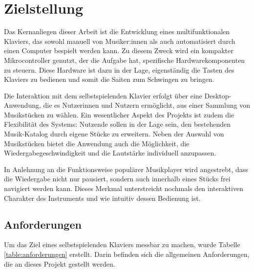 
\chapter{Zielstellung} \label{Zielstellung}

\nocite{*}


Das Kernanliegen dieser Arbeit ist die Entwicklung eines multifunktionalen Klaviers,
das sowohl manuell von Musiker:innen als auch automatisiert durch einen Computer bespielt werden kann.
Zu diesem Zweck wird ein kompakter Mikrocontroller genutzt, der die Aufgabe hat, spezifische Hardwarekomponenten zu steuern.
Diese Hardware ist dazu in der Lage, eigenständig die Tasten des Klaviers zu bedienen und somit die Saiten zum Schwingen zu bringen.

Die Interaktion mit dem selbstspielenden Klavier erfolgt über eine Desktop-Anwendung, die es Nutzerinnen und Nutzern ermöglicht,
aus einer Sammlung von Musikstücken zu wählen.
Ein wesentlicher Aspekt des Projekts ist zudem die Flexibilität des Systems: Nutzende sollen in der Lage sein,
den bestehenden Musik-Katalog durch eigene Stücke zu erweitern.
Neben der Auswahl von Musikstücken bietet die Anwendung auch die Möglichkeit,
die Wiedergabegeschwindigkeit und die Lautstärke individuell anzupassen.

In Anlehnung an die Funktionsweise populärer Musikplayer wird angestrebt,
dass die Wiedergabe nicht nur pausiert, sondern auch innerhalb eines Stücks frei navigiert werden kann.
Dieses Merkmal unterstreicht nochmals den interaktiven Charakter des Instruments und wie intuitiv dessen Bedienung ist.

\section{Anforderungen} \label{sec:zielstellung-anforderungen}

Um das Ziel eines selbstspielenden Klaviers messbar zu machen, wurde Tabelle \ref{table:anforderungen} erstellt.
Darin befinden sich die allgemeinen Anforderungen, die an dieses Projekt gestellt werden.

